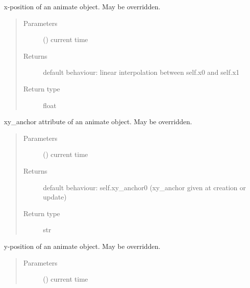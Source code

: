 \documentclass[letterpaper,10pt,english]{sphinxmanual}
\begin{document}
\begin{fulllineitems}
\begin{fulllineitems}
\label{\detokenize{Reference:salabim.Animate.x}}
x-position of an animate object. May be overridden.
\begin{quote}\begin{description}
\item[{Parameters}] \leavevmode
{} () \textendash{} current time

\item[{Returns}] \leavevmode
{} \textendash{} default behaviour: linear interpolation between self.x0 and self.x1

\item[{Return type}] \leavevmode
float

\end{description}\end{quote}

\end{fulllineitems}


\begin{fulllineitems}
\label{\detokenize{Reference:salabim.Animate.xy_anchor}}
xy\_anchor attribute of an animate object. May be overridden.
\begin{quote}\begin{description}
\item[{Parameters}] \leavevmode
{} () \textendash{} current time

\item[{Returns}] \leavevmode
{} \textendash{} default behaviour: self.xy\_anchor0 (xy\_anchor given at creation or update)

\item[{Return type}] \leavevmode
str

\end{description}\end{quote}

\end{fulllineitems}


\begin{fulllineitems}
\label{\detokenize{Reference:salabim.Animate.y}}
y-position of an animate object. May be overridden.
\begin{quote}\begin{description}
\item[{Parameters}] \leavevmode
{} () \textendash{} current time


\end{description}
\end{quote}
\end{fulllineitems}
\end{fulllineitems}
\end{document}
